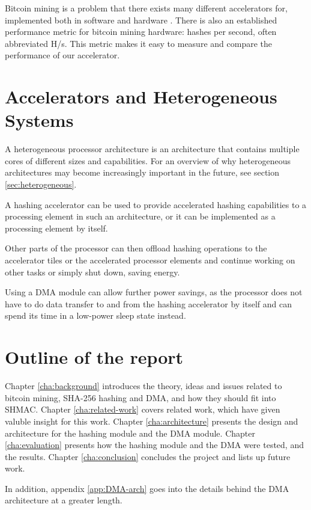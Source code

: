 Bitcoin mining is a problem that there exists many different accelerators
for, implemented both in software and hardware \cite{bespoke-silicon}.
There is also an established performance metric for bitcoin mining hardware:
hashes per second, often abbreviated H/s. This metric makes it easy
to measure and compare the performance of our accelerator.

\section{Accelerators and Heterogeneous Systems}

A heterogeneous processor architecture is an architecture that contains multiple
cores of different sizes and capabilities. For an overview of why heterogeneous
architectures may become increasingly important in the future, see section
\ref{sec:heterogeneous}.

A hashing accelerator can be used to provide accelerated hashing capabilities
to a processing element in such an architecture, or it can be implemented as
a processing element by itself.

Other parts of the processor can then offload hashing operations to the
accelerator tiles or the accelerated processor elements and continue
working on other tasks or simply shut down, saving energy.

Using a DMA module can allow further
power savings, as the processor does not have to do data transfer to
and from the hashing accelerator by itself and can spend its time
in a low-power sleep state instead.

\section{Outline of the report}
Chapter \ref{cha:background} introduces the theory, ideas and issues related to bitcoin mining, SHA-256 hashing and DMA, and how they should fit into SHMAC.
Chapter \ref{cha:related-work} covers related work, which have given valuble insight for this work.
Chapter \ref{cha:architecture} presents the design and architecture for the hashing module and the DMA module.
Chapter \ref{cha:evaluation} presents how the hashing module and the DMA were tested, and the results.
Chapter \ref{cha:conclusion} concludes the project and lists up future work.

In addition, appendix \ref{app:DMA-arch} goes into the details behind the DMA architecture at a greater length.
